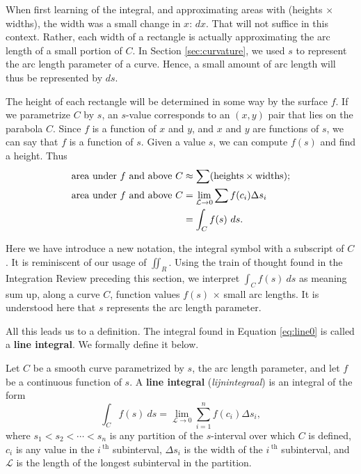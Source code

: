 When first learning of the integral, and approximating areas with (heights $\times$ widths), the width was a small change in $x$: $dx$. That will not suffice in this context. Rather, each width of a rectangle is actually approximating the arc length of a small portion of $C$. In Section \ref{sec:curvature}, we used $s$ to represent the arc length parameter of a curve. Hence, a small amount of arc length will thus be represented by $ds$. 

The height of each rectangle will be determined in some way by the surface $f$. If we parametrize $C$ by $s$, an $s$-value corresponds to an $(x,y)$ pair that lies on the parabola $C$. Since $f$ is a function of $x$ and $y$, and $x$ and $y$ are functions of $s$, we can say that $f$ is a function of $s$. Given a value $s$, we can compute $f(s)$ and find a height. Thus
\begin{align}
\text{area under $f$ and above $C$}&\approx \sum (\text{heights}\times\text{widths});\notag\\
		\text{area under $f$ and above $C$}							&=\lim_{\mathcal{L}\to0}\sum f(c_i)\Delta s_i\notag\\
									&=\int_Cf(s)\ ds.\label{eq:line0}
\end{align}

Here we have introduce a new notation, the integral symbol with a subscript of $C$. It is reminiscent of our usage of $\iint_R$. Using the train of thought found in the Integration Review preceding this section, we interpret $\int_C f(s)\ ds$ as meaning sum up, along a curve $C$, function values $f(s)$ $\times$ small arc lengths. It is understood here that $s$ represents the arc length parameter.

All this leads us to a definition. The integral found in Equation \ref{eq:line0} is called a \textbf{line integral}. We formally define it below.

\begin{definition}\label{def:line_integral1}
Let $C$ be a smooth curve parametrized by $s$, the arc length parameter, and let $f$ be a continuous function of $s$. A \textbf{line integral} (\textit{lijnintegraal}) is an integral of the form
$$\int_C f(s)\ ds = \lim_{\mathcal{L}\to 0}\sum_{i=1}^n f(c_i)\Delta s_i,$$
where $s_1<s_2<\cdots<s_n$ is any partition of the $s$-interval over which $C$ is defined, $c_i$ is any value in the $i\,^\text{th}$ subinterval,  $\Delta s_i$ is the width of the $i\,^\text{th}$ subinterval, and $\mathcal{L}$ is the length of the longest subinterval in the partition.%
\end{definition}

